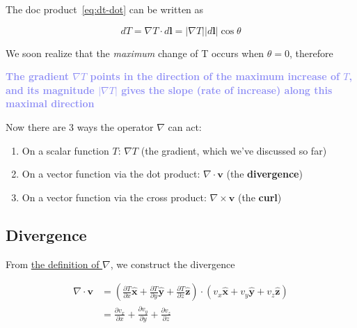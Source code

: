 \begin{tcolorbox}[
    parbox=false,
    colbacktitle=red!10!white,
    colback=blue!10!white,coltitle=red!70!black,
    title=The Geometrical Interpretation of the Gradient
]
    The doc product~\ref{eq:dt-dot} can be written as

    \begin{equation}
        dT = \nabla T \cdot d\boldsymbol{l} = \vert \nabla T \vert \vert d\boldsymbol{l} \vert \cos{\theta}
    \end{equation}

    We soon realize that the \textit{maximum} change of T occurs when $\theta = 0$, therefore

    \begin{tcolorbox}[colback=red!10!white]
        \begin{center}
            \textcolor[HTML]{8F8FF5}{\textbf{The gradient $\nabla T$ points in the direction of the maximum increase of $T$,
            and its magnitude $\vert \nabla T \vert$ gives the slope (rate of increase) along this maximal direction}}
        \end{center}
    \end{tcolorbox}
\end{tcolorbox}

Now there are 3 ways the operator $\nabla$ can act:

\begin{enumerate}
    \item On a scalar function $T$: $\nabla T$ (the gradient, which we've discussed so far)
    \item On a vector function via the dot product: $\nabla \cdot \boldsymbol{v}$ (the \textbf{divergence})
    \item On a vector function via the cross product: $\nabla \times \boldsymbol{v}$ (the \textbf{curl})
\end{enumerate}

\subsection{Divergence}

From \hyperref[eq:def-gradient]{the definition of $\nabla$}, we construct the divergence

\begin{align}
    \nabla \cdot \boldsymbol{v} &= \left( \frac{\partial T}{\partial x}\boldsymbol{\hat{x}} + \frac{\partial T}{\partial y}\boldsymbol{\hat{y}} + \frac{\partial T}{\partial z}\boldsymbol{\hat{z}} \right) \cdot (v_x\boldsymbol{\hat{x}} + v_y\boldsymbol{\hat{y}} + v_z\boldsymbol{\hat{z}}) \label{eq:divergence-dot-product} \\
    &= \frac{\partial v_x}{\partial x} + \frac{\partial v_y}{\partial y} + \frac{\partial v_z}{\partial z}
\end{align}

